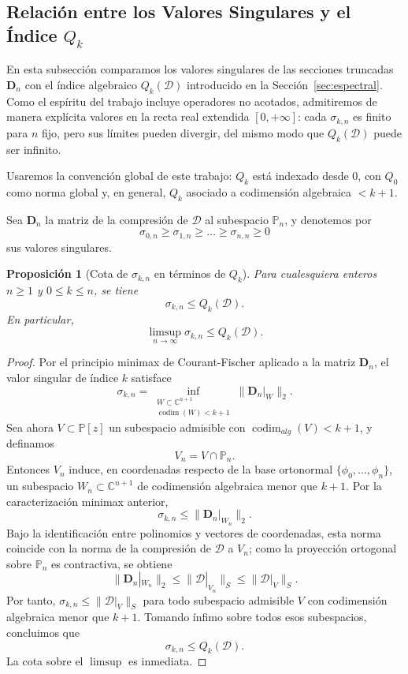 \documentclass[12pt,a4paper]{article}
\newtheorem{proposition}{Proposición}
\theoremstyle{definition}
\theoremstyle{remark}
\begin{document}
\subsection{Relación entre los Valores Singulares y el Índice $Q_k$}

En esta subsección comparamos los valores singulares de las secciones truncadas $\mathbf{D}_n$ con el índice algebraico $Q_k(\mathcal{D})$ introducido en la Sección~\ref{sec:espectral}. Como el espíritu del trabajo incluye operadores no acotados, admitiremos de manera explícita valores en la recta real extendida $[0,+\infty]$: cada $\sigma_{k,n}$ es finito para $n$ fijo, pero sus límites pueden divergir, del mismo modo que $Q_k(\mathcal{D})$ puede ser infinito.

Usaremos la convención global de este trabajo: $Q_k$ está indexado desde $0$, con $Q_0$ como norma global y, en general, $Q_k$ asociado a codimensión algebraica $<k+1$.

Sea $\mathbf{D}_n$ la matriz de la compresión de $\mathcal{D}$ al subespacio $\mathbb{P}_{n}$, y denotemos por
\[
	\sigma_{0,n} \ge \sigma_{1,n} \ge \dots \ge \sigma_{n,n} \ge 0
\]
sus valores singulares.

\begin{proposition}[Cota de $\sigma_{k,n}$ en términos de $Q_k$]\label{prop:sigma_qk}
	Para cualesquiera enteros $n \ge 1$ y $0 \le k \le n$, se tiene
	\[
		\sigma_{k,n} \le Q_k(\mathcal{D}).
	\]
	En particular,
	\[
		\limsup_{n \to \infty} \sigma_{k,n} \le Q_k(\mathcal{D}).
	\]
\end{proposition}

\begin{proof}
	Por el principio minimax de Courant-Fischer aplicado a la matriz $\mathbf{D}_n$, el valor singular de índice $k$ satisface
	\[
		\sigma_{k,n} = \inf_{\substack{W \subset \mathbb{C}^{n+1} \\ \operatorname{codim}(W) < k+1}} \|\mathbf{D}_n|_W\|_2.
	\]
	Sea ahora $V \subset \mathbb{P}[z]$ un subespacio admisible con $\operatorname{codim}_{alg}(V) < k+1$, y definamos
	\[
		V_n = V \cap \mathbb{P}_{n}.
	\]
	Entonces $V_n$ induce, en coordenadas respecto de la base ortonormal $\{\phi_0,\dots,\phi_{n}\}$, un subespacio $W_n \subset \mathbb{C}^{n+1}$ de codimensión algebraica menor que $k+1$. Por la caracterización minimax anterior,
	\[
		\sigma_{k,n} \le \|\mathbf{D}_n|_{W_n}\|_2.
	\]
	Bajo la identificación entre polinomios y vectores de coordenadas, esta norma coincide con la norma de la compresión de $\mathcal{D}$ a $V_n$; como la proyección ortogonal sobre $\mathbb{P}_{n}$ es contractiva, se obtiene
	\[
		\|\mathbf{D}_n|_{W_n}\|_2 \le \|\mathcal{D}|_{V_n}\|_S \le \|\mathcal{D}|_V\|_S.
	\]
	Por tanto, $\sigma_{k,n} \le \|\mathcal{D}|_V\|_S$ para todo subespacio admisible $V$ con codimensión algebraica menor que $k+1$. Tomando ínfimo sobre todos esos subespacios, concluimos que
	\[
		\sigma_{k,n} \le Q_k(\mathcal{D}).
	\]
	La cota sobre el $\limsup$ es inmediata.
\end{proof}
\end{document}
